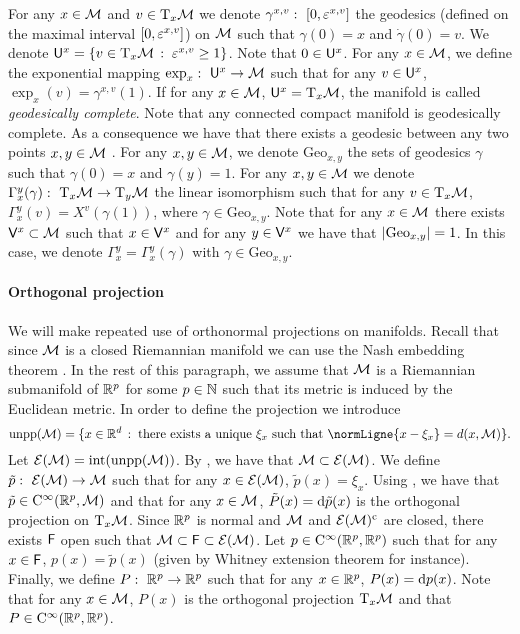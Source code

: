 For any $x \in \mathcal M$ and $v \in \mathrm{T}_x \mathcal M$ we denote
$\gamma^{x,v}: \ \left[0,\varepsilon^{x,v}\right]$ the geodesics (defined on the maximal
interval $\left[0, \varepsilon^{x,v}\right]$) on $\mathcal M$ such that $\gamma(0) = x$ and
$\dot \gamma(0) = v$. We denote
$\mathsf{U}^x = \{v \in \mathrm{T}_x \mathcal M\,:\; \varepsilon^{x,v} \geq 1\}$. Note
that $0 \in \mathsf{U}^x$. For any $x \in \mathcal M$, we define the exponential mapping
$\exp_x: \ \mathsf{U}^x \to \mathcal M$ such that for any $v \in \mathsf{U}^x$,
$\exp_x(v) = \gamma^{x,v}(1)$. If for any $x \in \mathcal M$,
$\mathsf{U}^x = \mathrm{T}_x \mathcal M$, the manifold is called \emph{geodesically
  complete}. Note that any connected compact manifold is geodesically
complete. As a consequence we have that there exists a geodesic between any two
points $x, y \in \mathcal M$ \cite[see][Lemma 6.18]{lee2018introduction}. For any
$x, y \in \mathcal M$, we denote $\mathrm{Geo}_{x,y}$ the sets of geodesics $\gamma$
such that $\gamma(0) = x$ and $\gamma(y) = 1$. For any $x, y \in \mathcal M$ we denote
$\Gamma_x^y(\gamma) : \ \mathrm{T}_x \mathcal M \to \mathrm{T}_y \mathcal M$ the linear
isomorphism such that for any $v \in \mathrm{T}_x \mathcal M$,
$\Gamma_x^y(v) = X^v(\gamma(1))$, where $\gamma \in \mathrm{Geo}_{x,y}$. Note
that for any $x \in \mathcal M$ there exists $\mathsf{V}^x \subset \mathcal M$ such that
$x \in \mathsf{V}^x$ and for any $y \in \mathsf{V}^x$ we have that
$\vert \mathrm{Geo}_{x,y} \vert=1$.  In this case, we denote
$\Gamma_x^y = \Gamma_x^y(\gamma)$ with $\gamma \in \mathrm{Geo}_{x,y}$.

\paragraph{Orthogonal projection} We will make repeated use of orthonormal
projections on manifolds. Recall that since $\mathcal M$ is a closed Riemannian manifold
we can use the Nash embedding theorem \citep{gunther1991isometric}. In the rest
of this paragraph, we assume that $\mathcal M$ is a Riemannian submanifold of $\mathbb{R}^p$
for some $p \in \mathbb{N}$ such that its metric is induced by the Euclidean
metric. In order to define the projection we introduce
\begin{equation}  
  \mathrm{unpp}(\M) = \ensembleLigne{x \in \rset^d}{\text{there exists a unique $\xi_x$ such that $\normLigne{x - \xi_x} = d(x, \M)$}}  . 
\end{equation}
Let $\mathcal{E}(\mathcal M) = \mathrm{int}(\mathrm{unpp}(\mathcal M))$. By \citet[Theorem
1]{leobacher2021existence}, we have that $\mathcal M \subset \mathcal{E}(\mathcal M)$. We define
$\tilde{p}: \ \mathcal{E}(\mathcal M) \to \mathcal M$ such that for any $x \in \mathcal{E}(\mathcal M)$,
$\tilde{p}(x) = \xi_x$. Using \citet[Theorem 2]{leobacher2021existence}, we have
that $\tilde{p} \in \mathrm{C}^\infty(\mathbb{R}^p, \mathcal M)$ and that for any $x \in \mathcal M$,
$\tilde{P}(x) = \mathrm{d} \tilde{p}(x)$ is the orthogonal projection on
$\mathrm{T}_x\mathcal M$. Since $\mathbb{R}^p$ is normal and $\mathcal M$ and
$\mathcal{E}(\mathcal M)^{\mathrm{c}}$ are closed, there exists $\mathsf{F}$ open such that
$\mathcal M \subset \mathsf{F} \subset \mathcal{E}(\mathcal M)$. Let
$p \in \mathrm{C}^\infty(\mathbb{R}^p, \mathbb{R}^p)$ such that for any $x \in \mathsf{F}$,
$p(x) = \tilde{p}(x)$ (given by Whitney extension theorem for
instance). Finally, we define $P: \ \mathbb{R}^p \to \mathbb{R}^p$ such that for any
$x \in \mathbb{R}^p$, $P(x) = \mathrm{d} p(x)$. Note that for any $x \in \mathcal M$, $P(x)$ is the
orthogonal projection $\mathrm{T}_x \mathcal M$ and that
$P \in \mathrm{C}^\infty(\mathbb{R}^p, \mathbb{R}^p)$.


